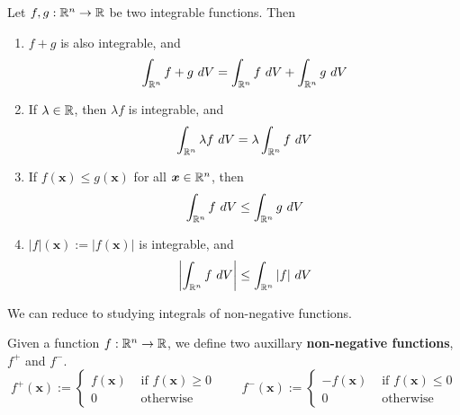 \begin{theorem}
    
    Let $f, g : \mathbb{R}^n \to \mathbb{R}$ be two integrable functions.  Then
    
    \begin{enumerate}
        \item $f+g$ is also integrable, and
        $$\int_{\R^n} f+g \ dV = \int_{\R^n} f \ dV + \int_{\R^n} g \ dV$$
        \item If $\lambda \in \mathbb{R}$, then $\lambda f$ is integrable, and 
        $$\int_{\R^n} \lambda f \ dV = \lambda \int_{\R^n} f \ dV$$
        \item If $f(\bm{x}) \leq g(\bm{x})$ for all $\bm{x} \in \mathbb{R}^n$, then $$\int_{\R^n} f \ dV \leq \int_{\R^n} g \ dV$$
        \item $|f|(\bm{x}) := |f(\bm{x})|$ is integrable, and $$\left|\int_{\R^n} f \ dV\right| \leq \int_{\R^n} |f| \ dV$$
    \end{enumerate}
    
    \end{theorem}

    \begin{corollary}
    We can reduce to studying integrals of non-negative functions.
    \end{corollary}
    
    \begin{definition}
    Given a function $f : \mathbb{R}^n \to \mathbb{R}$, we define two auxillary \textbf{non-negative functions}, $f^+$ and $f^-$.
    $$f^+(\bm{x}) := \left\{
		\begin{array}{ll}
			f(\bm{x}) & \text{ if } f(\bm{x}) \geq 0 \\
			0 & \text{ otherwise}
		\end{array}
		\right. \qquad f^-(\bm{x}) := \left\{
		\begin{array}{ll}
			-f(\bm{x}) & \text{ if } f(\bm{x}) \leq 0 \\
			0 & \text{ otherwise}
		\end{array}
		\right.$$
    
    \end{definition}

